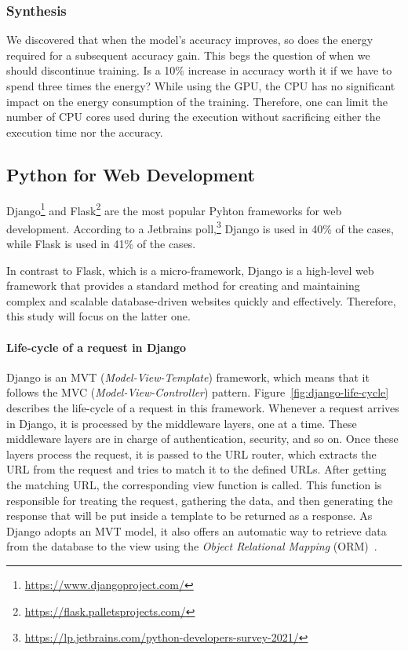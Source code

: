 \subsubsection{Synthesis}
We discovered that when the model's accuracy improves, so does the energy required for a subsequent accuracy gain.
This begs the question of when we should discontinue training.
Is a 10\% increase in accuracy worth it if we have to spend three times the energy?
While using the GPU, the CPU has no significant impact on the energy consumption of the training.
Therefore, one can limit the number of CPU cores used during the execution without sacrificing either the execution time nor the accuracy.


\subsection{Python for Web Development}\label{sec:webdev}
Django\footnote{\url{https://www.djangoproject.com/}} and Flask\footnote{\url{https://flask.palletsprojects.com/}} are the most popular Pyhton frameworks for web development.
According to a Jetbrains poll,\footnote{\url{https://lp.jetbrains.com/python-developers-survey-2021/}} Django is used in 40\% of the cases, while Flask is used in 41\% of the cases.

In contrast to Flask, which is a micro-framework, Django is a high-level web framework that provides a standard method for creating and maintaining complex and scalable database-driven websites quickly and effectively.
Therefore, this study will focus on the latter one.

\paragraph{Life-cycle of a request in Django}
Django is an MVT (\emph{Model-View-Template}) framework, which means that it follows the MVC (\emph{Model-View-Controller}) pattern.
Figure~\ref{fig:django-life-cycle} describes the life-cycle of a request in this framework.
Whenever a request arrives in Django, it is processed by the middleware layers, one at a time.
These middleware layers are in charge of authentication, security, and so on.
Once these layers process the request, it is passed to the URL router, which extracts the URL from the request and tries to match it to the defined URLs.
After getting the matching URL, the corresponding view function is called.
This function is responsible for treating the request, gathering the data, and then generating the response that will be put inside a template to be returned as a response.
As Django adopts an MVT model, it also offers an automatic way to retrieve data from the database to the view using the \emph{Object Relational Mapping} (ORM)~\cite{o2008object}.

